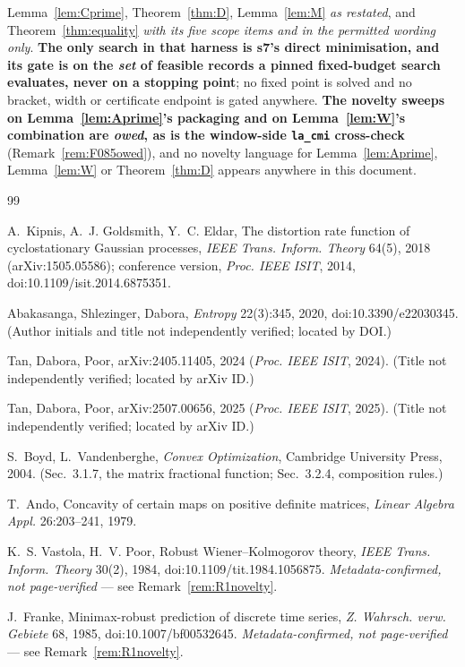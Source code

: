 \documentclass[11pt]{article}
\theoremstyle{definition}
\theoremstyle{remark}
\begin{document}
Lemma~\ref{lem:Cprime}, Theorem~\ref{thm:D}, Lemma~\ref{lem:M} \emph{as
restated}, and Theorem~\ref{thm:equality} \emph{with its five scope items and
in the permitted wording only}. \textbf{The only search in that harness is
s7's direct minimisation, and its gate is on the \emph{set} of feasible
records a pinned fixed-budget search evaluates, never on a stopping point};
no fixed point is solved and no bracket, width or certificate endpoint is
gated anywhere. \textbf{The novelty sweeps on Lemma~\ref{lem:Aprime}'s
packaging and on Lemma~\ref{lem:W}'s combination are \emph{owed}, as is the
window-side \texttt{la\_cmi} cross-check} (Remark~\ref{rem:F085owed}), and no
novelty language for Lemma~\ref{lem:Aprime}, Lemma~\ref{lem:W} or
Theorem~\ref{thm:D} appears anywhere in this document.

\begin{thebibliography}{99}

 A.~Kipnis, A.~J. Goldsmith, Y.~C. Eldar, The
distortion rate function of cyclostationary Gaussian processes,
\emph{IEEE Trans. Inform. Theory} 64(5), 2018 (arXiv:1505.05586);
conference version, \emph{Proc. IEEE ISIT}, 2014,
doi:10.1109/isit.2014.6875351.

 Abakasanga, Shlezinger, Dabora, \emph{Entropy}
22(3):345, 2020, doi:10.3390/e22030345. (Author initials and title not
independently verified; located by DOI.)

 Tan, Dabora, Poor, arXiv:2405.11405, 2024
(\emph{Proc. IEEE ISIT}, 2024). (Title not independently verified;
located by arXiv ID.)

 Tan, Dabora, Poor, arXiv:2507.00656, 2025
(\emph{Proc. IEEE ISIT}, 2025). (Title not independently verified;
located by arXiv ID.)

 S.~Boyd, L.~Vandenberghe, \emph{Convex
Optimization}, Cambridge University Press, 2004. (Sec.~3.1.7, the
matrix fractional function; Sec.~3.2.4, composition rules.)

 T.~Ando, Concavity of certain maps on positive
definite matrices, \emph{Linear Algebra Appl.} 26:203--241, 1979.

 K.~S. Vastola, H.~V. Poor, Robust
Wiener--Kolmogorov theory, \emph{IEEE Trans. Inform. Theory} 30(2),
1984, doi:10.1109/tit.1984.1056875. \emph{Metadata-confirmed, not
page-verified} --- see Remark~\ref{rem:R1novelty}.

 J.~Franke, Minimax-robust prediction of
discrete time series, \emph{Z. Wahrsch. verw. Gebiete} 68, 1985,
doi:10.1007/bf00532645. \emph{Metadata-confirmed, not page-verified}
--- see Remark~\ref{rem:R1novelty}.


\end{thebibliography}
\end{document}
